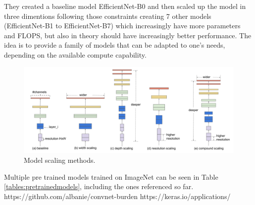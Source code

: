 They created a baseline model EfficientNet-B0 and then scaled up the model in three dimentions following those constraints creating 7 other models (EfficientNet-B1 to EfficientNet-B7) which increasingly have more parameters and FLOPS, but also in theory should have increasingly better performance. The idea is to provide a family of models that can be adapted to one's needs, depending on the available compute capability.

\begin{figure}[ht]
  \centering
    \includegraphics[scale=0.5, width=\linewidth]{figs/modelscaling.png}
  \caption{Model scaling methods. \cite{efficientnet}}
  \label{fig:modelscaling}
\end{figure}

Multiple pre trained models trained on ImageNet can be seen in Table \ref{tables:pretrainedmodels}, including the ones referenced so far. https://github.com/albanie/convnet-burden
https://keras.io/applications/

